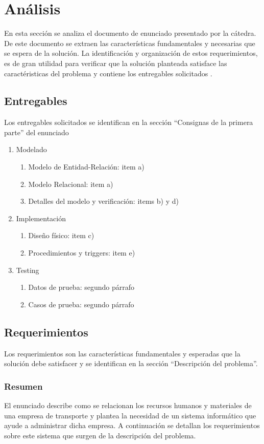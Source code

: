 \section{An\'alisis}
En esta secci\'on se analiza el documento de enunciado presentado por la c\'atedra.
De este documento se extraen las caracter\'isticas fundamentales y necesarias que se espera de la soluci\'on. 
La identificaci\'on y organizaci\'on de estos requerimientos, es de gran utilidad para verificar que la soluci\'on planteada
satisface las caract\'eristicas del problema y contiene los entregables solicitados .\\
\subsection{Entregables}
Los entregables solicitados se identifican en la secci\'on ``Consignas de la primera parte'' del enunciado
\begin{enumerate}
\item Modelado
  \begin{enumerate}[label=\Roman{*}]
  \item Modelo de Entidad-Relaci\'on: item a)
  \item Modelo Relacional: item a)
  \item Detalles del modelo y verificaci\'on: items b) y d)
  \end{enumerate}
\item Implementaci\'on
  \begin{enumerate}[label=\Roman{*}]
  \item Dise\~no f\'isico: item c)
  \item Procedimientos y triggers: item e)
  \end{enumerate}
\item Testing
  \begin{enumerate}[label=\Roman{*}]
  \item Datos de prueba: segundo p\'arrafo
  \item Casos de prueba: segundo p\'arrafo
  \end{enumerate}
\end{enumerate}

\subsection{Requerimientos}
Los requerimientos son las caracter\'isticas fundamentales y esperadas que la soluci\'on debe satisfacer y se identifican en
la secci\'on ``Descripci\'on del problema''. 
\subsubsection{Resumen}
El enunciado describe como se relacionan los recursos humanos y materiales de una empresa de transporte y plantea 
la necesidad de un sistema inform\'atico que ayude a administrar dicha empresa. A continuaci\'on se detallan 
los requerimientos sobre este sistema que surgen de la descripci\'on del problema.
